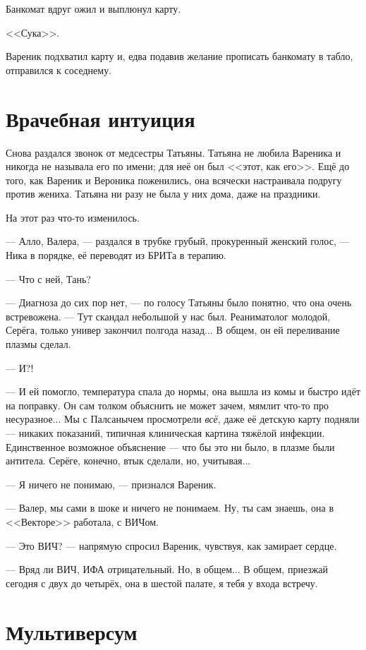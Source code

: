 \documentclass[a4paper,10pt,fleqn]{book}\usepackage{polyglossia}\setdefaultlanguage{english}\setotherlanguage{russian}\defaultfontfeatures{Ligatures=TeX,Mapping=tex-text} \usepackage{xcolor}\definecolor{lightgray}{HTML}{bbbbbb}\color{lightgray}\newcommand{\ml}[3]{\textcolor{black}{#3}}
\begin{document}
Банкомат вдруг ожил и выплюнул карту.

<<Сука>>.

Вареник подхватил карту и, едва подавив желание прописать банкомату в табло, отправился к соседнему.

\section{Врачебная интуиция}

Снова раздался звонок от медсестры Татьяны.
Татьяна не любила Вареника и никогда не называла его по имени;
для неё он был <<этот, как его>>.
Ещё до того, как Вареник и Вероника поженились, она всячески настраивала подругу против жениха.
Татьяна ни разу не была у них дома, даже на праздники.

На этот раз что-то изменилось.

--- Алло, Валера, --- раздался в трубке грубый, прокуренный женский голос, --- Ника в порядке, её переводят из БРИТа в терапию.

--- Что с ней, Тань?

--- Диагноза до сих пор нет, --- по голосу Татьяны было понятно, что она очень встревожена.
--- Тут скандал небольшой у нас был.
Реаниматолог молодой, Серёга, только универ закончил полгода назад...
В общем, он ей переливание плазмы сделал.

--- И?!

--- И ей помогло, температура спала до нормы, она вышла из комы и быстро идёт на поправку.
Он сам толком объяснить не может зачем, мямлит что-то про несуразное...
Мы с Палсанычем просмотрели \emph{всё}, даже её детскую карту подняли --- никаких показаний, типичная клиническая картина тяжёлой инфекции.
Единственное возможное объяснение --- что бы это ни было, в плазме были антитела.
Серёге, конечно, втык сделали, но, учитывая...

--- Я ничего не понимаю, --- признался Вареник.

--- Валер, мы сами в шоке и ничего не понимаем.
Ну, ты сам знаешь, она в <<Векторе>> работала, с ВИЧом.

--- Это ВИЧ? --- напрямую спросил Вареник, чувствуя, как замирает сердце.

--- Вряд ли ВИЧ, ИФА отрицательный.
Но, в общем...
В общем, приезжай сегодня с двух до четырёх, она в шестой палате, я тебя у входа встречу.

\section{Мультиверсум}
\end{document}
